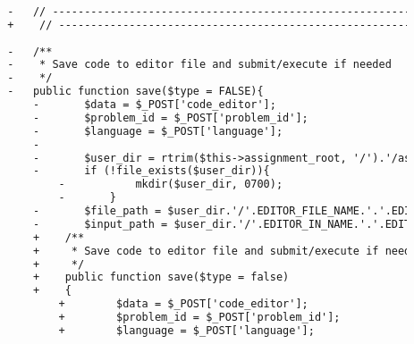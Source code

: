 \begin{lstlisting}[language=diff, caption=Perubahan pada kode Submit.php]
		
		-	// ------------------------------------------------------------------------
		+    // ------------------------------------------------------------------------
		
		-	/**
		-	 * Save code to editor file and submit/execute if needed
		-	 */
		-	public function save($type = FALSE){
			-		$data = $_POST['code_editor'];
			-		$problem_id = $_POST['problem_id'];
			-		$language = $_POST['language'];
			-		
			-		$user_dir = rtrim($this->assignment_root, '/').'/assignment_'.$this->user->selected_assignment['id'].'/p'.$problem_id.'/'.$this->user->username;
			-		if (!file_exists($user_dir)){
				-			mkdir($user_dir, 0700);
				-		}
			-		$file_path = $user_dir.'/'.EDITOR_FILE_NAME.'.'.EDITOR_FILE_EXT;
			-		$input_path = $user_dir.'/'.EDITOR_IN_NAME.'.'.EDITOR_FILE_EXT;
			+    /**
			+     * Save code to editor file and submit/execute if needed
			+     */
			+    public function save($type = false)
			+    {
				+        $data = $_POST['code_editor'];
				+        $problem_id = $_POST['problem_id'];
				+        $language = $_POST['language'];
				

\end{lstlisting}
